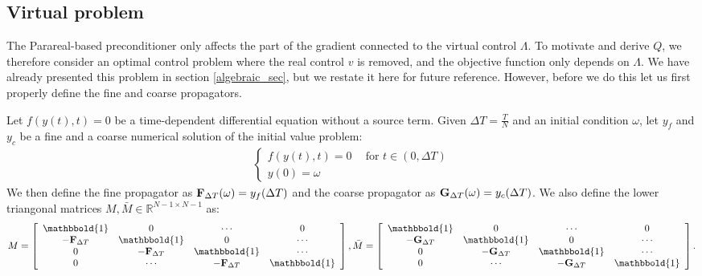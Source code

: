 \subsection{Virtual problem} \label{vir_sec}
The Parareal-based preconditioner only affects the part of the gradient connected to the virtual control $\Lambda$. To motivate and derive $Q$, we therefore consider an optimal control problem where the real control $v$ is removed, and the objective function only depends on $\Lambda$. We have already presented this problem in section \ref{algebraic_sec}, but we restate it here for future reference. However, before we do this let us first properly define the fine and coarse propagators.
\begin{definition} \label{prop_def}
Let $f(y(t),t)=0$ be a time-dependent differential equation without a source term. Given $\Delta T=\frac{T}{N}$ and an initial condition $\omega$, let $y_f$ and $y_c$ be a fine and a coarse numerical solution of the initial value problem:
\begin{align}
 \left\{
     \begin{array}{lr}
		f(y(t),t)=0 \ \quad \textrm{for $t \in (0,\Delta T)$} \\
		y(0)=\omega
	\end{array}
	\right.	
\end{align}
We then define the fine propagator as $\bold F_{\Delta T}(\omega) = y_f(\Delta T)$ and the coarse propagator as $\bold G_{\Delta T}(\omega) = y_c(\Delta T)$. We also define the lower triangonal matrices $M,\bar M\in\mathbb{R}^{N-1\times N-1}$ as: 
\begin{align*}
M= \left[ \begin{array}{cccc}
   \mathbbold{1} & 0 & \cdots & 0 \\  
   -\bold{F}_{\Delta T} & \mathbbold{1} & 0 & \cdots \\ 
   0 &-\bold{F}_{\Delta T} & \mathbbold{1}  & \cdots \\
   0 &\cdots &-\bold{F}_{\Delta T} & \mathbbold{1}  \\
   \end{array}  \right],
\bar M= \left[ \begin{array}{cccc}
   \mathbbold{1} & 0 & \cdots & 0 \\  
   -\bold{G}_{\Delta T} & \mathbbold{1} & 0 & \cdots \\ 
   0 &-\bold{G}_{\Delta T} & \mathbbold{1}  & \cdots \\
   0 &\cdots &-\bold{G}_{\Delta T} & \mathbbold{1}   \\
   \end{array}  \right].
\end{align*}
\end{definition}
